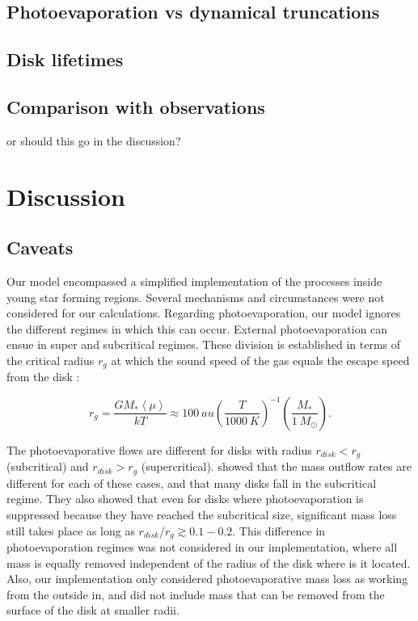 \documentclass[fleqn,usenatbib]{mnras}
\newcommand\note[1]{{\colorbox{yellow!60}{\color{magenta}#1}}}
\begin{document}
\subsection{Photoevaporation vs dynamical truncations}

\subsection{Disk lifetimes}

\subsection{Comparison with observations}
\note{or should this go in the discussion?}

\section{Discussion}
\label{sec:discussion}

\subsection{Caveats}
Our model encompassed a simplified implementation of the processes inside young star forming regions. Several mechanisms and circumstances were not considered for our calculations. Regarding photoevaporation, our model ignores the different regimes in which this can occur. External photoevaporation can ensue in super and subcritical regimes. These division is established in terms of the critical radius $r_g$ at which the sound speed of the gas equals the escape speed from the disk \citep{adams2004}:

\begin{equation}
r_g = \frac{GM_*\left\langle\mu\right\rangle}{kT} \approx \SI{100}{au} \left(\frac{T}{\SI{1000}{K}}\right)^{-1}\left(\frac{M_*}{\SI{1}{M_\odot}}\right).
\end{equation}

The photoevaporative flows are different for disks with radius $r_{disk} < r_g$ (subcritical) and $r_{disk} > r_g$ (supercritical). \citet{adams2004} showed that the mass outflow rates are different for each of these cases, and that many disks fall in the subcritical regime. They also showed that even for disks where photoevaporation is suppressed because they have reached the subcritical size, significant mass loss still takes place as long as $r_{disk}/r_g \gtrsim 0.1-0.2$. This difference in photoevaporation regimes was not considered in our implementation, where all mass is equally removed independent of the radius of the disk where is it located. Also, our implementation only considered photoevaporative mass loss as working from the outside in, and did not include mass that can be removed from the surface of the disk at smaller radii. 
\end{document}
